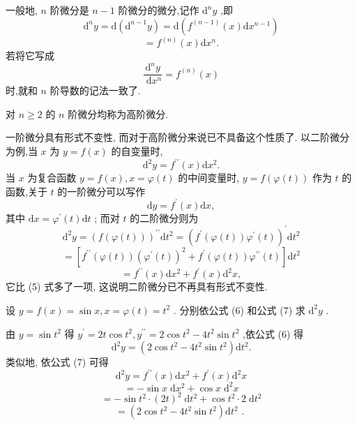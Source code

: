 一般地, \(n\) 阶微分是 \(n - 1\) 阶微分的微分,记作 \({\mathrm{d}}^{n}y\) ,即
\[
{\mathrm{d}}^{n}y = \mathrm{d}\left( {{\mathrm{d}}^{n - 1}y}\right)  = \mathrm{d}\left( {{f}^{\left( n - 1\right) }\left( x\right) \mathrm{d}{x}^{n - 1}}\right)
\]
\[
= {f}^{\left( n\right) }\left( x\right) \mathrm{d}{x}^{n}.
\]
若将它写成
\[
\frac{{\mathrm{d}}^{n}y}{\mathrm{\;d}{x}^{n}} = {f}^{\left( n\right) }\left( x\right)
\]
时,就和 \(n\) 阶导数的记法一致了.

对 \(n \geq  2\) 的 \(n\) 阶微分均称为高阶微分.

一阶微分具有形式不变性, 而对于高阶微分来说已不具备这个性质了. 以二阶微分为例,当 \(x\) 为 \(y = f\left( x\right)\) 的自变量时,
\[
{\mathrm{d}}^{2}y = {f}^{\prime \prime }\left( x\right) \mathrm{d}{x}^{2}. \tag{6}
\]
当 \(x\) 为复合函数 \(y = f\left( x\right) ,x = \varphi \left( t\right)\) 的中间变量时, \(y = f\left( {\varphi \left( t\right) }\right)\) 作为 \(t\) 的函数,关于 \(t\) 的一阶微分可以写作
\[
\mathrm{d}y = {f}^{\prime }\left( x\right) \mathrm{d}x,
\]
其中 \(\mathrm{d}x = {\varphi }^{\prime }\left( t\right) \mathrm{d}t\) ; 而对 \(t\) 的二阶微分则为
\[
{\mathrm{d}}^{2}y = {\left( f\left( \varphi \left( t\right) \right) \right) }^{\prime \prime }\mathrm{d}{t}^{2} = {\left( {f}^{\prime }\left( \varphi \left( t\right) \right) {\varphi }^{\prime }\left( t\right) \right) }^{\prime }\mathrm{d}{t}^{2}
\]
\[
= \left\lbrack  {{f}^{\prime \prime }\left( {\varphi \left( t\right) }\right) {\left( {\varphi }^{\prime }\left( t\right) \right) }^{2} + {f}^{\prime }\left( {\varphi \left( t\right) }\right) {\varphi }^{\prime \prime }\left( t\right) }\right\rbrack  \mathrm{d}{t}^{2}
\]
\[
= {f}^{\prime \prime }\left( x\right) \mathrm{d}{x}^{2} + {f}^{\prime }\left( x\right) {\mathrm{d}}^{2}x, \tag{7}
\]
它比 (5) 式多了一项, 这说明二阶微分已不再具有形式不变性.

\begin{example}
设 \(y = f\left( x\right)  = \sin x,x = \varphi \left( t\right)  = {t}^{2}\) . 分别依公式 (6) 和公式 (7) 求 \({\mathrm{d}}^{2}y\) .
\end{example}


\begin{solution}
由 \(y = \sin {t}^{2}\) 得 \({y}^{\prime } = {2t}\cos {t}^{2},{y}^{\prime \prime } = 2\cos {t}^{2} - 4{t}^{2}\sin {t}^{2}\) ,依公式 (6) 得
\[
{\mathrm{d}}^{2}y = \left( {2\cos {t}^{2} - 4{t}^{2}\sin {t}^{2}}\right) \mathrm{d}{t}^{2}.
\]
类似地, 依公式 (7) 可得
\[
{\mathrm{d}}^{2}y = {f}^{\prime \prime }\left( x\right) \mathrm{d}{x}^{2} + {f}^{\prime }\left( x\right) {\mathrm{d}}^{2}x
\]
\[
=  - \sin x\mathrm{\;d}{x}^{2} + \cos x{\mathrm{\;d}}^{2}x
\]
\[
=  - \sin {t}^{2} \cdot  {\left( 2t\right) }^{2}\mathrm{\;d}{t}^{2} + \cos {t}^{2} \cdot  2\mathrm{\;d}{t}^{2}
\]
\[
= \left( {2\cos {t}^{2} - 4{t}^{2}\sin {t}^{2}}\right) \mathrm{d}{t}^{2}\text{ . }
\]
\end{solution}

